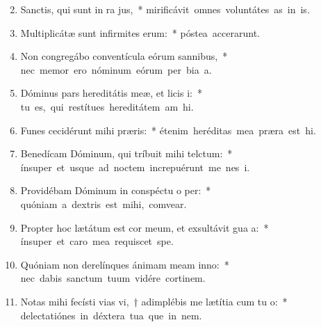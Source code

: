 \begin{flushleft}
\begin{enumerate}[leftmargin=*]
\setcounter{enumi}{1}

\item Sanctis, qui sunt in ra jus,~* \mbox{mirificávit omnes voluntátes as in is.}
\item Multiplicátæ sunt infirmites erum:~* \mbox{póstea accerarunt.}
\item Non congregábo conventícula eórum  sannibus,~* \mbox{nec memor ero nóminum eórum per bia a.}
\item Dóminus pars hereditátis meæ, et licis i:~* \mbox{tu es, qui restítues hereditátem am hi.}
\item Funes cecidérunt mihi  præris:~* \mbox{étenim heréditas mea præra est hi.}
\item Benedícam Dóminum, qui tríbuit mihi telctum:~* \mbox{ínsuper et usque ad noctem increpuérunt me nes i.}
\item Providébam Dóminum in conspéctu o per:~* \mbox{quóniam a dextris est mihi,  comvear.}
\item Propter hoc lætátum est cor meum, et exsultávit gua a:~* \mbox{ínsuper et caro mea requiscet  spe.}
\item Quóniam non derelínques ánimam meam  inno:~* \mbox{nec dabis sanctum tuum vidére cortinem.}
\item Notas mihi fecísti vias vi,~† adimplébis me lætítia cum tu o:~* \mbox{delectatiónes in déxtera tua que in nem.}

\end{enumerate}
\end{flushleft}

